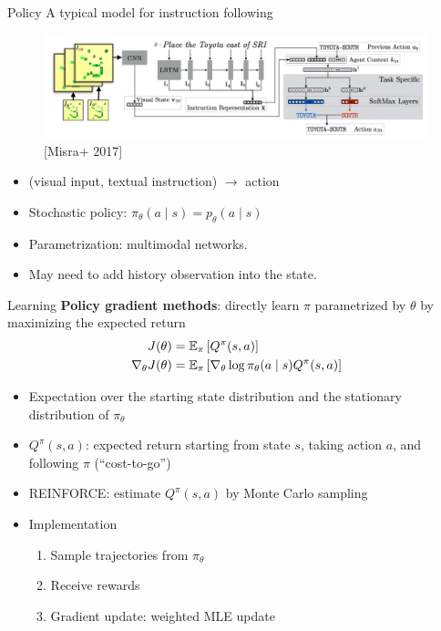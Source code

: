 \documentclass[usenames,dvipsnames,11pt,aspectratio=169]{beamer}
\begin{document}
\begin{frame}
    {Policy}
    A typical model for instruction following
    \vspace{-1em}
    \begin{figure}
        \includegraphics[height=3cm]{figures/policy}
        \caption{[Misra+ 2017]}
    \end{figure}
    \vspace{-1em}
    \begin{itemize}
        \item (visual input, textual instruction) $\to$ action
        \item Stochastic policy:
            $\pi_\theta(a\mid s)=p_\theta(a\mid s)$
        \item Parametrization: multimodal networks.
        \item May need to add history observation into the state.
    \end{itemize}
\end{frame}

\begin{frame}
    {Learning}
    \textbf{Policy gradient methods}:
    directly learn $\pi$ parametrized by $\theta$
    by maximizing the expected return
    \begin{align*}
        J(\theta) &= \mathbb{E}_\pi\left[ Q^\pi(s,a) \right] \\
            \nabla_\theta J(\theta) &= 
            \mathbb{E}_\pi\left[ \nabla_\theta\log\pi_\theta(a\mid s)Q^\pi(s,a) \right]
    \end{align*}
            \vspace{-1em}
            \begin{itemize}
                \item Expectation over the starting state distribution and the stationary distribution of $\pi_\theta$
                \item $Q^\pi(s,a)$: expected return starting from state $s$, taking action $a$, and following $\pi$ (``cost-to-go'')
                \item REINFORCE: estimate $Q^\pi(s,a)$ by Monte Carlo sampling
                \item Implementation
                    \begin{enumerate}
                        \item Sample trajectories from $\pi_\theta$
                        \item Receive rewards
                        \item Gradient update: weighted MLE update
                    \end{enumerate}
            \end{itemize}
\end{frame}
\end{document}
